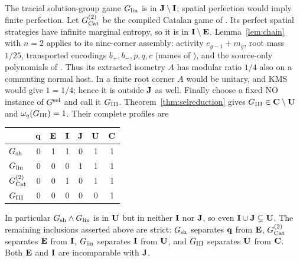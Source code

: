 The tracial solution-group game $G_{\rm lin}$ is in $\mathbf J\setminus\mathbf I$; spatial perfection would imply finite perfection. Let $G^{(2)}_{\operatorname{Cat}}$ be the compiled Catalan game of \cite[Theorem C and Sections 3 and 6]{Entropy}. Its perfect spatial strategies have infinite marginal entropy, so it is in $\mathbf I\setminus\mathbf E$. Lemma~\ref{lem:chain} with $n=2$ applies to its nine-corner assembly: activity $e_{g-1}+m_g$, root mass $1/25$, transported encodings $b_+,b_-,p,q,c$ (names of \cite[Section 6]{Entropy}), and the source-only polynomials of \cite[Section 6]{Entropy}. Thus its extracted isometry $A$ has modular ratio $1/4$ also on a commuting normal host. In a finite root corner $A$ would be unitary, and KMS would give $1=1/4$; hence it is outside $\mathbf J$ as well. Finally choose a fixed NO instance of $G^{\rm sel}$ and call it $G_{\mathrm{III}}$. Theorem~\ref{thm:selreduction} gives $G_{\mathrm{III}}\in\mathbf C\setminus\mathbf U$ and $\omega_q(G_{\mathrm{III}})=1$. Their complete profiles are
\begin{center}\small
\begin{tabular}{@{}lcccccc@{}}
\toprule & $\mathbf q$ & $\mathbf E$ & $\mathbf I$ & $\mathbf J$ & $\mathbf U$ & $\mathbf C$\\\midrule
$G_{\rm sh}$ &0&1&1&0&1&1\\
$G_{\rm lin}$ &0&0&0&1&1&1\\
$G^{(2)}_{\operatorname{Cat}}$ &0&0&1&0&1&1\\
$G_{\mathrm{III}}$ &0&0&0&0&0&1\\\bottomrule
\end{tabular}
\end{center}
In particular $G_{\rm sh}\wedge G_{\rm lin}$ is in $\mathbf U$ but in neither $\mathbf I$ nor $\mathbf J$, so even $\mathbf I\cup\mathbf J\subsetneq\mathbf U$. The remaining inclusions asserted above are strict: $G_{\rm sh}$ separates $\mathbf q$ from $\mathbf E$, $G^{(2)}_{\operatorname{Cat}}$ separates $\mathbf E$ from $\mathbf I$, $G_{\rm lin}$ separates $\mathbf I$ from $\mathbf U$, and $G_{\mathrm{III}}$ separates $\mathbf U$ from $\mathbf C$. Both $\mathbf E$ and $\mathbf I$ are incomparable with $\mathbf J$.

